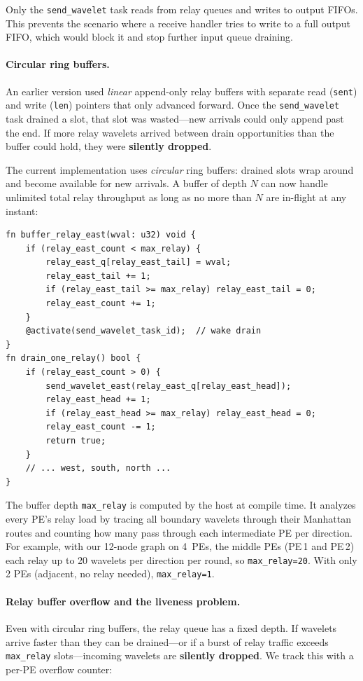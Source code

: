 \documentclass[11pt,letterpaper]{article}
\begin{document}
Only the \texttt{send\_wavelet} task reads from relay queues and writes to output FIFOs. This prevents the scenario where a receive handler tries to write to a full output FIFO, which would block it and stop further input queue draining.

\paragraph{Circular ring buffers.}
An earlier version used \emph{linear} append-only relay buffers with separate read (\texttt{sent}) and write (\texttt{len}) pointers that only advanced forward. Once the \texttt{send\_wavelet} task drained a slot, that slot was wasted---new arrivals could only append past the end. If more relay wavelets arrived between drain opportunities than the buffer could hold, they were \textbf{silently dropped}.

The current implementation uses \emph{circular} ring buffers: drained slots wrap around and become available for new arrivals. A buffer of depth $N$ can now handle unlimited total relay throughput as long as no more than $N$ are in-flight at any instant:

\begin{lstlisting}[language=CSL, numbers=none]
fn buffer_relay_east(wval: u32) void {
    if (relay_east_count < max_relay) {
        relay_east_q[relay_east_tail] = wval;
        relay_east_tail += 1;
        if (relay_east_tail >= max_relay) relay_east_tail = 0;
        relay_east_count += 1;
    }
    @activate(send_wavelet_task_id);  // wake drain
}
fn drain_one_relay() bool {
    if (relay_east_count > 0) {
        send_wavelet_east(relay_east_q[relay_east_head]);
        relay_east_head += 1;
        if (relay_east_head >= max_relay) relay_east_head = 0;
        relay_east_count -= 1;
        return true;
    }
    // ... west, south, north ...
}
\end{lstlisting}

The buffer depth \texttt{max\_relay} is computed by the host at compile time. It analyzes every PE's relay load by tracing all boundary wavelets through their Manhattan routes and counting how many pass through each intermediate PE per direction. For example, with our 12-node graph on 4~PEs, the middle PEs (PE\,1 and PE\,2) each relay up to 20 wavelets per direction per round, so \texttt{max\_relay=20}. With only 2 PEs (adjacent, no relay needed), \texttt{max\_relay=1}.

\paragraph{Relay buffer overflow and the liveness problem.}
Even with circular ring buffers, the relay queue has a fixed depth. If wavelets arrive faster than they can be drained---or if a burst of relay traffic exceeds \texttt{max\_relay} slots---incoming wavelets are \textbf{silently dropped}. We track this with a per-PE overflow counter:
\end{document}
